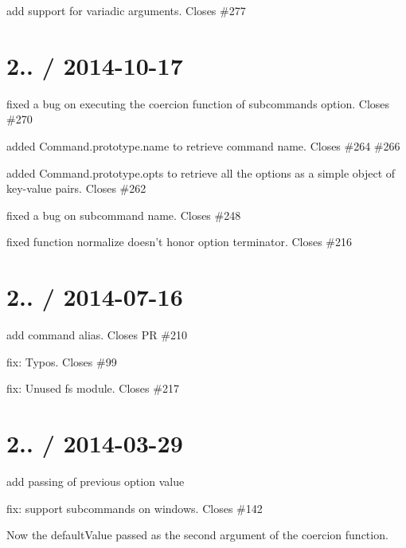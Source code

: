 \begin{DoxyItemize}
\item add support for variadic arguments. Closes \#277 
\end{DoxyItemize}

\section*{2.. / 2014-\/10-\/17 }


\begin{DoxyItemize}
\item fixed a bug on executing the coercion function of subcommands option. Closes \#270
\item added {\ttfamily Command.\+prototype.\+name} to retrieve command name. Closes \#264 \#266 
\item added {\ttfamily Command.\+prototype.\+opts} to retrieve all the options as a simple object of key-\/value pairs. Closes \#262 
\item fixed a bug on subcommand name. Closes \#248 
\item fixed function normalize doesn’t honor option terminator. Closes \#216 
\end{DoxyItemize}

\section*{2.. / 2014-\/07-\/16 }


\begin{DoxyItemize}
\item add command alias\textquotesingle{}. Closes PR \#210
\item fix\+: Typos. Closes \#99
\item fix\+: Unused fs module. Closes \#217
\end{DoxyItemize}

\section*{2.. / 2014-\/03-\/29 }


\begin{DoxyItemize}
\item add passing of previous option value
\item fix\+: support subcommands on windows. Closes \#142
\item Now the default\+Value passed as the second argument of the coercion function.
\end{DoxyItemize}

